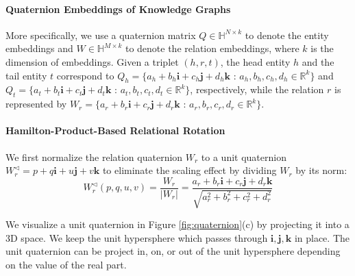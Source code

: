 \documentclass{article}
\begin{document}
\paragraph{Quaternion Embeddings of Knowledge Graphs}
More specifically, we use a quaternion matrix $Q \in \mathbb{H}^{N \times k}$ to denote the entity embeddings and  $W \in \mathbb{H}^{M \times k}$ to denote the relation embeddings, where $k$ is the dimension of embeddings. Given a triplet $(h, r, t)$, the head entity $h$ and the tail entity $t$ correspond to $Q_h = \{a_h + b_h \textbf{i} + c_h \textbf{j} + d_h \textbf{k}$ : $a_h, b_h, c_h, d_h \in \mathbb{R}^k\}$ and $Q_t = \{a_t + b_t \textbf{i} + c_t \textbf{j} + d_t \textbf{k}$ : $a_t, b_t, c_t, d_t \in \mathbb{R}^k\}$, respectively, while the relation $r$ is represented by $W_r =  \{a_r + b_r \textbf{i} + c_r \textbf{j} + d_r \textbf{k}$ : $a_r, b_r, c_r, d_r \in \mathbb{R}^k\}$.


\paragraph{Hamilton-Product-Based Relational Rotation}
 We first normalize the relation quaternion $W_r$ to a unit quaternion $ W_r^{\triangleleft} = p + q\textbf{i} + u\textbf{j} + v\textbf{k}$ to eliminate the scaling effect by dividing $W_r$ by its norm:
\begin{equation}
    W_r^{\triangleleft}(p, q, u, v) = \frac{W_r}{|W_r|} = \frac{ a_r + b_r \textbf{i} + c_r \textbf{j} + d_r \textbf{k} }{\sqrt{a_r^2 + b_r^2 + c_r^2 + d_r^2}}
\end{equation}

We visualize a unit quaternion in Figure \ref{fig:quaternion}(c) by projecting it into a 3D space. We keep the unit hypersphere which passes through $\textbf{i},\textbf{j},\textbf{k}$ in place. The unit quaternion can be project in, on, or out of the unit hypersphere depending on the value of the real part.
\end{document}
